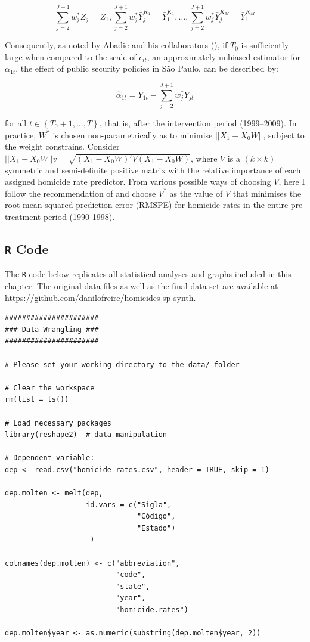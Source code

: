 $$\sum_{j = 2}^{J + 1} w_{j}^{*} Z_{j} = Z_{1}, \sum_{j = 2}^{J + 1} w_{j}^{*}\bar{Y}_{j}^{K_{1}} = \bar{Y}_{1}^{K_{1}}, \dots, \sum_{j = 2}^{J + 1} w_{j}^{*}\bar{Y}_{j}^{K_{M}} = \bar{Y}_{1}^{K_{M}}$$ 

Consequently, as noted by Abadie and his collaborators (\citeyear{abadie2010}), if $T_{0}$ is sufficiently large when compared to the scale of $\epsilon_{it}$, an approximately unbiased estimator for $\alpha_{1t}$, the effect of public security policies in São Paulo, can be described by:

$$\hat{\alpha}_{1t} = Y_{1t} - \sum_{j = 2}^{J + 1} w_{j}^{*} Y_{jt}$$

for all $t \in \left\{T_{0} + 1, \dots, T \right\}$, that is, after the intervention period (1999--2009). In practice, $W^{*}$ is chosen non-parametrically as to minimise $||X_{1} - X_{0}W||$, subject to the weight constrains. Consider $||X_{1} - X_{0}W||v = \sqrt{(X_{1} - X_{0}W)'V (X_{1} - X_{0}W)}$, where $V$ is a $(k \times k)$ symmetric and semi-definite positive matrix with the relative importance of each assigned homicide rate predictor. From various possible ways of choosing $V$, here I follow the recommendation of \citet{abadie2003} and choose $V^{*}$ as the value of $V$ that minimises the root mean squared prediction error (RMSPE) for homicide rates in the entire pre-treatment period (1990-1998).


\subsection{\texttt{R} Code}
\label{sec:synth-code}

The \texttt{R} code below replicates all statistical analyses and graphs included in this chapter. The original data files as well as the final data set are available at \url{https://github.com/danilofreire/homicides-sp-synth}. 

\singlespacing
\small
\begin{verbatim}
######################
### Data Wrangling ###
######################

# Please set your working directory to the data/ folder

# Clear the workspace
rm(list = ls())

# Load necessary packages
library(reshape2)  # data manipulation

# Dependent variable:
dep <- read.csv("homicide-rates.csv", header = TRUE, skip = 1)

dep.molten <- melt(dep,
                   id.vars = c("Sigla",
                               "Código",
                               "Estado")
                    )

colnames(dep.molten) <- c("abbreviation",
                          "code",
                          "state",
                          "year",
                          "homicide.rates")

dep.molten$year <- as.numeric(substring(dep.molten$year, 2))
\end{verbatim}

